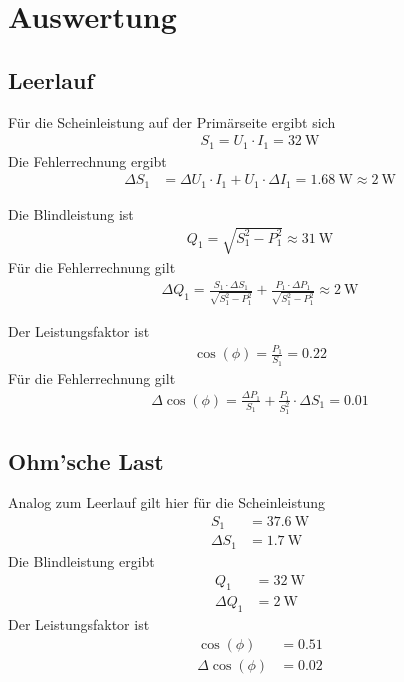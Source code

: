 \documentclass{article}
\newcommand{\W}{\text{W}}
\begin{document}
\section{Auswertung}

\subsection{Leerlauf}
Für die Scheinleistung auf der Primärseite ergibt sich
\begin{align*}
S_1 = U_1\cdot I_1 = 32~\text{W}
\end{align*}
Die Fehlerrechnung ergibt
\begin{align*}
\Delta S_1 &= \Delta U_1\cdot I_1 + U_1\cdot \Delta I_1 = 1.68~\W \approx 2~\W
\end{align*}

Die Blindleistung ist
\begin{align*}
Q_1 = \sqrt{S_1^2 - P_1^2} \approx 31~\W
\end{align*}
Für die Fehlerrechnung gilt
\begin{align*}
\Delta Q_1 = \frac{S_1\cdot \Delta S_1}{\sqrt{S_1^2-P_1^2}} + \frac{P_1\cdot \Delta P_1}{\sqrt{S_1^2-P_1^2}} \approx 2~\W
\end{align*}

Der Leistungsfaktor ist
\begin{align*}
\cos(\phi) = \frac{P_1}{S_1} = 0.22
\end{align*}
Für die Fehlerrechnung gilt
\begin{align*}
\Delta\cos(\phi) = \frac{\Delta P_1}{S_1} + \frac{P_1}{S_1^2}\cdot \Delta S_1 = 0.01
\end{align*}

\subsection{Ohm'sche Last}

Analog zum Leerlauf gilt hier für die Scheinleistung
\begin{align*}
S_1 &= 37.6~\W \\
\Delta S_1 &= 1.7~\W
\end{align*}
Die Blindleistung ergibt
\begin{align*}
Q_1 &= 32~\W \\
\Delta Q_1 &= 2~\W
\end{align*}
Der Leistungsfaktor ist
\begin{align*}
\cos(\phi) &= 0.51 \\
\Delta \cos(\phi) &= 0.02
\end{align*}
\end{document}
